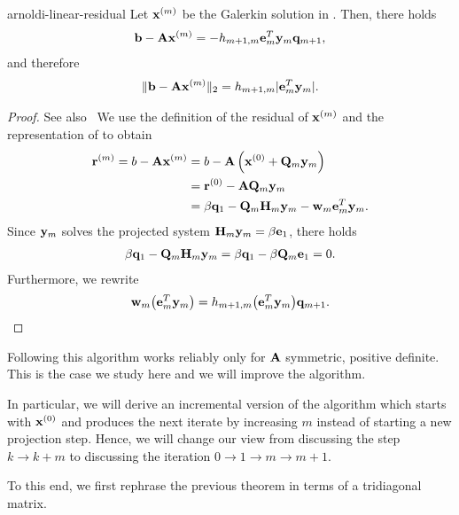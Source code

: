 \begin{Theorem}{arnoldi-linear-residual}
  Let $\mathbf x^{(m)}$ be the Galerkin solution in
  . Then, there holds
  \begin{gather}
    \mathbf b-\mathbf A\mathbf x^{(m)} = -h_{m+1,m} \mathbf e_m^T \mathbf y_m \mathbf q_{m+1},
  \end{gather}
  and therefore
  \begin{gather}
    \lVert\mathbf b-\mathbf A\mathbf x^{(m)}\rVert_2 = h_{m+1,m} \lvert\mathbf e_m^T \mathbf y_m\rvert.
  \end{gather}  
\end{Theorem}

\begin{proof}
  See also~\cite[Proposition 6.7]{Saad00} We use the definition of the
  residual of $\mathbf x^{(m)}$ and the representation of
   to obtain
  \begin{align}
    \mathbf r^{(m)} = b-\mathbf A\mathbf x^{(m)}
    &= b- \mathbf A\left(\mathbf x^{(0)} + \mathbf Q_m\mathbf y_m\right)\\
    &=\mathbf r^{(0)} - \mathbf A\mathbf Q_m\mathbf y_m\\
    &= \beta\mathbf q_1 - \mathbf Q_m\mathbf H_m\mathbf y_m - \mathbf w_m\mathbf e_m^T\mathbf y_m.
  \end{align}
  Since $\mathbf y_m$ solves the projected system
  $\mathbf H_m\mathbf y_m = \beta\mathbf e_1$, there holds
  \begin{gather}
    \beta\mathbf q_1 - \mathbf Q_m\mathbf H_m\mathbf y_m = \beta\mathbf q_1 - \beta \mathbf Q_m\mathbf e_1 = 0.
  \end{gather}
  Furthermore, we rewrite
  \begin{gather}
    \mathbf w_m\bigl(\mathbf e_m^T\mathbf y_m\bigr) = h_{m+1,m} \bigl(\mathbf e_m^T\mathbf y_m\bigr) \mathbf q_{m+1}.
  \end{gather}
\end{proof}

\begin{remark}
  Following  this algorithm
  works reliably only for $\mathbf A$ symmetric, positive definite. This
  is the case we study here and we will improve the algorithm.

  In particular, we will derive an incremental version of the
  algorithm which starts with $\mathbf x^{(0)}$ and produces the next
  iterate by increasing $m$ instead of starting a new projection
  step. Hence, we will change our view from discussing the step
  $k\to k+m$ to discussing the iteration $0\to 1\to m\to m+1$.

  To this end, we first rephrase the previous theorem in terms of a
  tridiagonal matrix.
\end{remark}

